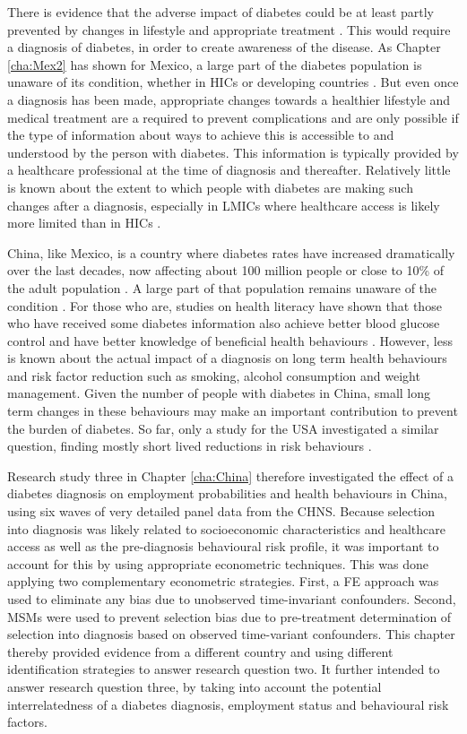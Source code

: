 There is evidence that the adverse impact of diabetes could be at least partly prevented by changes in lifestyle and appropriate treatment \parencite{Wareham2016}. This would require a diagnosis of diabetes, in order to create awareness of the disease. As Chapter \ref{cha:Mex2} has shown for Mexico, a large part of the diabetes population is unaware of its condition, whether in \acp{HIC} or developing countries \parencite{Beagley2014}. But even once a diagnosis has been made, appropriate changes towards a healthier lifestyle and medical treatment are a required to prevent complications and are only possible if the type of information about ways to achieve this is accessible to and understood by the person with diabetes. This information is typically provided by a healthcare professional at the time of diagnosis and thereafter. Relatively little is known about the extent to which people with diabetes are making such changes after a diagnosis, especially in \acp{LMIC} where healthcare access is likely more limited than in \acp{HIC} \parencite{Mills2014}.

China, like Mexico, is a country where diabetes rates have increased dramatically over the last decades, now affecting about 100 million people or close to 10\% of the adult population \parencite{Risk2016}. A large part of that population remains unaware of the condition \parencite{Wang2015}. For those who are, studies on health literacy have shown that those who have received some diabetes information also achieve better blood glucose control and have better knowledge of beneficial health behaviours \parencite{Guo2012}. However, less is known about the actual impact of a diagnosis on long term health behaviours and risk factor reduction such as smoking, alcohol consumption and weight management. Given the number of people with diabetes in China, small long term changes in these behaviours may make an important contribution to prevent the burden of diabetes. So far, only a study for the USA investigated a similar question, finding mostly short lived reductions in risk behaviours \parencite{Slade2012}. 

Research study three in Chapter \ref{cha:China} therefore investigated the effect of a diabetes diagnosis on employment probabilities and health behaviours in China, using six waves of very detailed panel data from the \ac{CHNS}. Because selection into diagnosis was likely related to socioeconomic characteristics and healthcare access as well as the pre-diagnosis behavioural risk profile, it was important to account for this by using appropriate econometric techniques. This was done applying two complementary econometric strategies. First, a \ac{FE} approach was used to eliminate any bias due to unobserved time-invariant confounders. Second, \acp{MSM} were used to prevent selection bias due to pre-treatment determination of selection into diagnosis based on observed time-variant confounders. This chapter thereby provided evidence from a different country and using different identification strategies to answer research question two. It further intended to answer research question three, by taking into account the potential interrelatedness of a diabetes diagnosis, employment status and behavioural risk factors.

